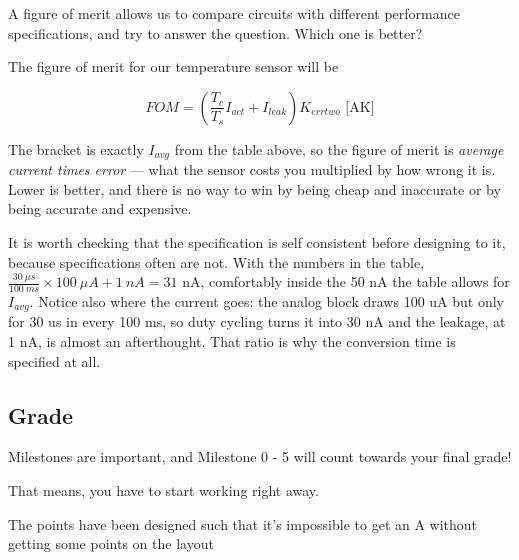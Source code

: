 A figure of merit allows us to compare circuits with different
performance specifications, and try to answer the question. Which one is
better?

The figure of merit for our temperature sensor will be

\[FOM = \left(\frac{T_{c}}{T_s}I_{act} + I_{leak}\right) K_{errtwo} \text{ [AK]}\]

The bracket is exactly \(I_{avg}\) from the table above, so the figure
of merit is \emph{average current times error} --- what the sensor costs
you multiplied by how wrong it is. Lower is better, and there is no way
to win by being cheap and inaccurate or by being accurate and expensive.

It is worth checking that the specification is self consistent before
designing to it, because specifications often are not. With the numbers
in the table,
\(\frac{30\ \mu s}{100\ ms}\times 100\ \mu A + 1\ nA = 31\) nA,
comfortably inside the 50 nA the table allows for \(I_{avg}\). Notice
also where the current goes: the analog block draws 100 uA but only for
30 us in every 100 ms, so duty cycling turns it into 30 nA and the
leakage, at 1 nA, is almost an afterthought. That ratio is why the
conversion time is specified at all.

\subsection{Grade}\label{grade}

Milestones are important, and Milestone 0 - 5 will count towards your
final grade!

That means, you have to start working right away.

The points have been designed such that it's impossible to get an A
without getting some points on the layout

